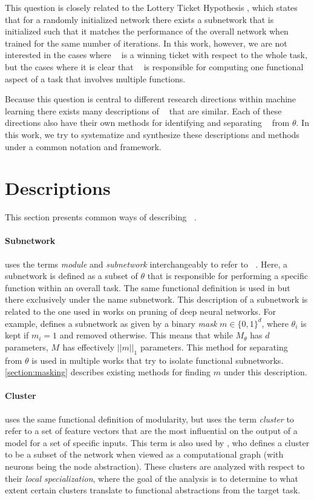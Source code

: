 \documentclass[11pt]{article}
\DeclareMathOperator*{\subnetwork}{\hat{\theta}}
\begin{document}
This question is closely related to the Lottery Ticket Hypothesis \citep{frankle2018the}, which states that for a randomly initialized network there exists a subnetwork that is initialized such that it matches the performance of the overall network when trained for the same number of iterations. In this work, however, we are not interested in the cases where $\subnetwork$ is a winning ticket with respect to the whole task, but the cases where it is clear that $\subnetwork$ is responsible for computing one functional aspect of a task that involves multiple functions.

Because this question is central to different research directions within machine learning there exists many descriptions of $\subnetwork$ that are similar. Each of these directions also have their own methods for identifying and separating $\subnetwork$ from $\theta$. In this work, we try to systematize and synthesize these descriptions and methods under a common notation and framework.


\section{Descriptions}
This section presents common ways of describing $\subnetwork$.
\paragraph{Subnetwork}
\citet{csordas2020neural} uses the terms \textit{module} and \textit{subnetwork} interchangeably to refer to $\subnetwork$. Here, a subnetwork is defined as a subset of $\theta$ that is responsible for performing a specific function within an overall task. The same functional definition is used in \citet{lepori2023break} but there exclusively under the name subnetwork. This description of a subnetwork is related to the one used in works on pruning of deep neural networks. For example, \citet{savarese2020winning} defines a subnetwork as given by a binary \textit{mask} $m \in \{0, 1\}^d$, where $\theta_i$ is kept if $m_i = 1$ and removed otherwise. This means that while $M_\theta$ has $d$ parameters, $M_{\subnetwork}$ has effectively $||m||_1$ parameters. This method for separating $\subnetwork$ from $\theta$ is used in multiple works that try to isolate functional subnetworks. \cref{section:masking} describes existing methods for finding $m$ under this description.
\paragraph{Cluster}
\citet{watanabe2019interpreting} uses the same functional definition of modularity, but uses the term \textit{cluster} to refer to a set of feature vectors that are the most influential on the output of a model for a set of specific inputs. This term is also used by \citet{casper2022graphical}, who defines a cluster to be a subset of the network when viewed as a computational graph (with neurons being the node abstraction). These clusters are analyzed with respect to their \textit{local specialization}, where the goal of the analysis is to determine to what extent certain clusters translate to functional abstractions from the target task.
\end{document}
